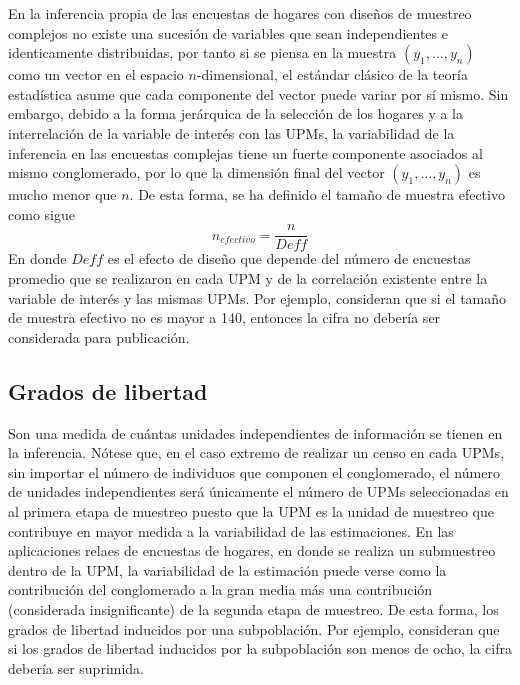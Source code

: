 En la inferencia propia de las encuestas de hogares con diseños de muestreo complejos no existe una sucesión de variables que sean independientes e identicamente distribuidas, por tanto si se piensa en la muestra \((y_1, \ldots, y_n)\) como un vector en el espacio \(n\)-dimensional, el estándar clásico de la teoría estadística asume que cada componente del vector puede variar por sí mismo. Sin embargo, debido a la forma jerárquica de la selección de los hogares y a la interrelación de la variable de interés con las UPMs, la variabilidad de la inferencia en las encuestas complejas tiene un fuerte componente asociados al mismo conglomerado, por lo que la dimensión final del vector \((y_1, \ldots, y_n)\) es mucho menor que \(n\). De esta forma, se ha definido el tamaño de muestra efectivo como sigue
\[
n_{efectivo} = \frac{n}{Deff}
\]
En donde \(Deff\) es el efecto de diseño que depende del número de encuestas promedio que se realizaron en cada UPM y de la correlación existente entre la variable de interés y las mismas UPMs. Por ejemplo, \citet{Hornik_Maklan_Cadell_Prado_Barmada_Jacobsohn_Orwin_Sridharan_Zador_Southwell_etal} consideran que si el tamaño de muestra efectivo no es mayor a 140, entonces la cifra no debería ser considerada para publicación.

\hypertarget{grados-de-libertad}{%
\subsection*{Grados de libertad}\label{grados-de-libertad}}


Son una medida de cuántas unidades independientes de información se tienen en la inferencia. Nótese que, en el caso extremo de realizar un censo en cada UPMs, sin importar el número de individuos que componen el conglomerado, el número de unidades independientes será únicamente el número de UPMs seleccionadas en al primera etapa de muestreo puesto que la UPM es la unidad de muestreo que contribuye en mayor medida a la variabilidad de las estimaciones. En las aplicaciones relaes de encuestas de hogares, en donde se realiza un submuestreo dentro de la UPM, la variabilidad de la estimación puede verse como la contribución del conglomerado a la gran media más una contribución (considerada insignificante) de la segunda etapa de muestreo. De esta forma, los grados de libertad inducidos por una subpoblación. Por ejemplo, \citet{Parker_Talih_Malec_2017} consideran que si los grados de libertad inducidos por la subpoblación son menos de ocho, la cifra debería ser suprimida.


